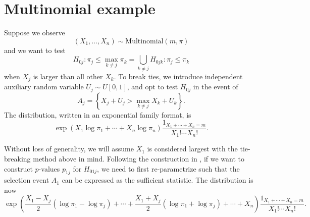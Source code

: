 \documentclass[11pt]{article}
\begin{document}
\section{Multinomial example}
\label{sec:multinomial_example}

Suppose we observe
$$\left(X_1, \ldots, X_n\right) \sim \text{Multinomial}\left(m, \pi\right)$$
and we want to test
$$H_{0j}: \pi_j \le \max_{k \ne j} \pi_k = \bigcup_{k \ne j} H_{0jk}: \pi_j \le \pi_k$$
when $X_j$ is larger than all other $X_k$. To break ties, we introduce independent auxiliary random variable $U_j \sim U\left[0,1\right]$, and opt to test $H_{0j}$ in the event of
$$A_j = \left\{X_j + U_j > \max_{k \ne j} X_k + U_k\right\}.$$
The distribution, written in an exponential family format, is
$$\exp\left(X_1 \log \pi_1 + \cdots + X_n \log \pi_n\right) \frac{1_{X_1 + \cdots + X_n = m}}{X_1! \cdots X_n!}.$$

Without loss of generality, we will assume $X_1$ is considered largest with the tie-breaking method above in mind. Following the construction in \cite{Fithian:2014ws}, if we want to construct $p$-values $p_{1j}$ for $H_{01j}$, we need to first re-parametrize such that the selection event $A_1$ can be expressed as the sufficient statistic. The distribution is now
$$\exp\left(\frac{X_1 - X_j}{2} \left(\log \pi_1 - \log \pi_j\right) + \cdots + \frac{X_1 + X_j}{2} \left(\log \pi_1 + \log \pi_j\right) + \cdots + X_n\right) \frac{1_{X_1 + \cdots + X_n = m}}{X_1! \cdots X_n!}.$$
\end{document}
